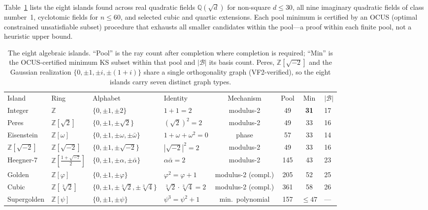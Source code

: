 \documentclass[twocolumn,prl,superscriptaddress,nofootinbib]{revtex4-2}
\newcommand{\Z}{\mathbb{Z}}
\newcommand{\Q}{\mathbb{Q}}
\begin{document}
Table~\ref{tab:islands} lists the eight islands found across real quadratic fields
$\Q(\sqrt d)$ for non-square $d \leq 30$, all nine imaginary quadratic fields of
class number~1, cyclotomic fields for $n \leq 60$, and selected cubic and quartic
extensions.  Each pool minimum is certified by an OCUS (optimal constrained
unsatisfiable subset) procedure that exhausts all smaller candidates within the
pool---a proof within each finite pool, not a heuristic upper bound.

\begin{table}[t]
\caption{\label{tab:islands}The eight algebraic islands.  ``Pool'' is the ray count
after completion where completion is required; ``Min'' is the OCUS-certified
minimum KS subset within that pool and $|\mathcal{B}|$ its basis count.  Peres,
$\Z[\sqrt{-2}]$ and the Gaussian realization $\{0,\pm1,\pm i,\pm(1{+}i)\}$ share a
single orthogonality graph (VF2-verified), so the eight islands carry seven
distinct graph types.}
\begin{ruledtabular}
\begin{tabular}{llllcccl}
Island & Ring & Alphabet & Identity & Mechanism & Pool & Min & $|\mathcal{B}|$ \\
\colrule
Integer        & $\Z$                     & $\{0,\pm1,\pm2\}$                    & $1+1=2$                 & modulus-2          & 49  & \textbf{31} & 17 \\
Peres          & $\Z[\sqrt2]$             & $\{0,\pm1,\pm\sqrt2\}$               & $(\sqrt2)^2=2$          & modulus-2          & 49  & 33 & 16 \\
Eisenstein     & $\Z[\omega]$             & $\{0,\pm1,\pm\omega,\pm\bar\omega\}$ & $1+\omega+\omega^2=0$   & phase              & 57  & 33 & 14 \\
$\Z[\sqrt{-2}]$& $\Z[\sqrt{-2}]$          & $\{0,\pm1,\pm\sqrt{-2}\}$            & $|\sqrt{-2}|^2=2$       & modulus-2          & 49  & 33 & 16 \\
Heegner-7      & $\Z[\tfrac{1+\sqrt{-7}}2]$ & $\{0,\pm1,\pm\alpha,\pm\bar\alpha\}$ & $\alpha\bar\alpha=2$  & modulus-2          & 145 & 43 & 23 \\
Golden         & $\Z[\varphi]$            & $\{0,\pm1,\pm\varphi\}$              & $\varphi^2=\varphi+1$   & modulus-2 (compl.) & 205 & 52 & 25 \\
Cubic          & $\Z[\sqrt[3]2]$          & $\{0,\pm1,\pm\sqrt[3]2,\pm\sqrt[3]4\}$ & $\sqrt[3]2\cdot\sqrt[3]4=2$ & modulus-2 (compl.) & 361 & 58 & 26 \\
Supergolden    & $\Z[\psi]$               & $\{0,\pm1,\pm\psi\}$                 & $\psi^3=\psi^2+1$       & min.\ polynomial   & 157 & $\leq 47$ & --- \\
\end{tabular}
\end{ruledtabular}
\end{table}
\end{document}
